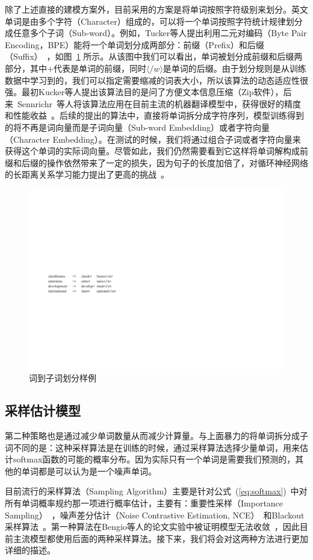 除了上述直接的建模方案外，目前采用的方案是将单词按照字符级别来划分。英文单词是由多个字符（Character）组成的，可以将一个单词按照字符统计规律划分成任意多个子词（Sub-word）。例如，Tucker等人提出利用二元对编码（Byte Pair Encoding，BPE）能将一个单词划分成两部分：前缀（Prefix）和后缀（Suffix）~，如图~\ref{fig:subword} 所示。从该图中我们可以看出，单词被划分成前缀和后缀两部分，其中$+$代表是单词的前缀，同时$\langle /w \rangle$是单词的后缀。由于划分规则是从训练数据中学习到的，我们可以指定需要缩减的词表大小，所以该算法的动态适应性很强。最初Kucker等人提出该算法目的是问了方便文本信息压缩（Zip软件），后来~Sennrichr~等人将该算法应用在目前主流的机器翻译模型中，获得很好的精度和性能收益~。后续的提出的算法中，直接将单词拆分成字符序列，模型训练得到的将不再是词向量而是子词向量（Sub-word Embedding）或者字符向量（Character Embedding）。在测试的时候，我们将通过组合子词或者字符向量来获得这个单词的实际词向量。尽管如此，我们仍然需要看到它这样将单词解构成前缀和后缀的操作依然带来了一定的损失，因为句子的长度加倍了，对循环神经网络的长距离关系学习能力提出了更高的挑战~。

\begin{figure}[!h]
  \centering
\includegraphics[width=0.56\linewidth]{./figures/subword.pdf}
\caption{词到子词划分样例}\label{fig:subword}
\end{figure}

\subsection{采样估计模型}
第二种策略也是通过减少单词数量从而减少计算量。与上面暴力的将单词拆分成子词不同的是：这种采样算法是在训练的时候，通过采样算法选择少量单词，用来估计softmax函数的可能的概率分布。因为实际只有一个单词是需要我们预测的，其他的单词都是可以认为是一个噪声单词。

目前流行的采样算法（Sampling Algorithm）主要是针对公式~(\ref{eq:softmax})~中对所有单词概率规约那一项进行概率估计，主要有：重要性采样（Importance Sampling）~，噪声差分估计（Noise Contrastive Estimation, NCE）~和Blackout 采样算法~。第一种算法在Bengio等人的论文实验中被证明模型无法收敛~，因此目前主流模型都使用后面的两种采样算法。接下来，我们将会对这两种方法进行更加详细的描述。

